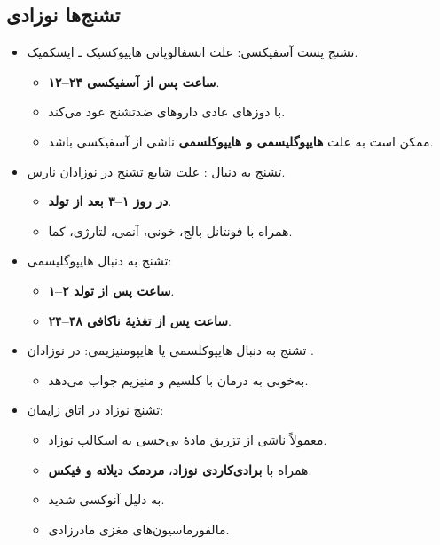 \documentclass[12pt,a4paper]{article}
\begin{document}
\subsection*{تشنج‌ها نوزادی}
\begin{itemize}
\item تشنج پست آسفیکسی: علت انسفالوپاتی هایپوکسیک ـ ایسکمیک.
  \begin{itemize}
  \item \textbf{۱۲–۲۴ ساعت پس از آسفیکسی}.
  \item با دوزهای عادی داروهای ضدتشنج عود می‌کند.
  \item ممکن است به علت \textbf{هایپوگلیسمی و هایپوکلسمی} ناشی از آسفیکسی باشد.
  \end{itemize}
\item تشنج به دنبال : علت شایع تشنج در نوزادان نارس.
  \begin{itemize}
  \item \textbf{در روز ۱–۳ بعد از تولد}.
  \item همراه با فونتانل بالج،  خونی، آنمی، لتارژی، کما.
  \end{itemize}
\item تشنج به دنبال هایپوگلیسمی:
  \begin{itemize}
  \item \textbf{۱–۲ ساعت پس از تولد}.
  \item \textbf{۲۴–۴۸ ساعت پس از تغذیهٔ ناکافی}.
  \end{itemize}
\item تشنج به دنبال هایپوکلسمی یا هایپومنیزیمی: در نوزادان .
  \begin{itemize}
  \item به‌خوبی به درمان با کلسیم و منیزیم جواب می‌دهد.
  \end{itemize}
\item تشنج نوزاد در اتاق زایمان:
  \begin{itemize}
  \item معمولاً ناشی از تزریق مادهٔ بی‌حسی به اسکالپ نوزاد.
  \item همراه با \textbf{برادی‌کاردی نوزاد}، \textbf{مردمک دیلاته و فیکس}.
  \item به دلیل آنوکسی شدید.
  \item مالفورماسیون‌های مغزی مادرزادی.
  \end{itemize}
\end{itemize}

\clearpage
\end{document}
